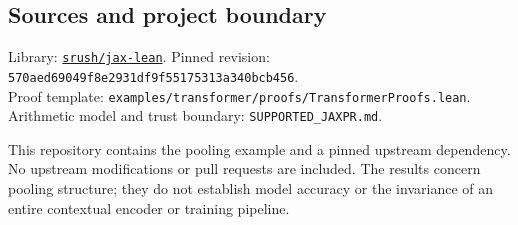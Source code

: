 \documentclass[11pt]{article}
\newcommand{\code}[1]{\nolinkurl{#1}}
\begin{document}
\subsection*{Sources and project boundary}
Library: \href{https://github.com/srush/jax-lean}{\texttt{srush/jax-lean}}. Pinned revision:\\
{\footnotesize\code{570aed69049f8e2931df9f55175313a340bcb456}}.\\
Proof template: {\footnotesize\code{examples/transformer/proofs/TransformerProofs.lean}}.\\
Arithmetic model and trust boundary: \code{SUPPORTED_JAXPR.md}.

This repository contains the pooling example and a pinned upstream dependency.
No upstream modifications or pull requests are included. The results concern pooling
structure; they do not establish model accuracy or the invariance of an entire
contextual encoder or training pipeline.
\end{document}
